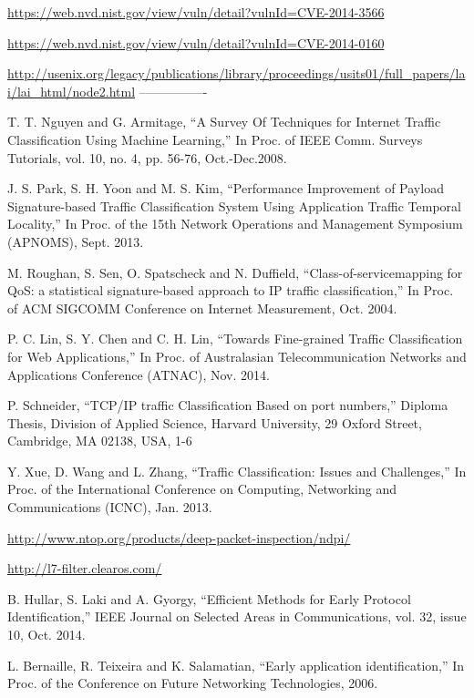 \begin{thebibliography}{1}
\url{https://web.nvd.nist.gov/view/vuln/detail?vulnId=CVE-2014-3566}

\url{https://web.nvd.nist.gov/view/vuln/detail?vulnId=CVE-2014-0160}

\url{http://usenix.org/legacy/publications/library/proceedings/usits01/full_papers/lai/lai_html/node2.html}
----------------

T. T. Nguyen and G. Armitage, 
``A Survey Of Techniques for Internet Traffic Classification Using Machine Learning,'' In Proc. of IEEE Comm. Surveys Tutorials, vol. 10, no. 4, pp. 56-76, Oct.-Dec.2008.

J. S. Park, S. H. Yoon and M. S. Kim,
``Performance Improvement of Payload Signature-based Traffic Classification System Using Application Traffic Temporal Locality,'' In Proc. of the 15th Network Operations and Management Symposium (APNOMS), Sept. 2013. 

M. Roughan, S. Sen, O. Spatscheck and N. Duffield, 
``Class-of-servicemapping for QoS: a statistical signature-based approach to IP traffic classification,''  In Proc. of ACM SIGCOMM Conference on Internet Measurement, Oct. 2004.

P. C. Lin, S. Y. Chen and C. H. Lin, 
``Towards Fine-grained Traffic Classification for Web Applications,'' In Proc. of Australasian Telecommunication Networks and Applications Conference (ATNAC), Nov. 2014.

P. Schneider,
``TCP/IP traffic Classification Based on port numbers,'' Diploma Thesis, Division of Applied Science, Harvard University, 29 Oxford Street, Cambridge, MA 02138, USA, 1-6

Y. Xue, D. Wang and L. Zhang,
``Traffic Classification: Issues and Challenges,'' In Proc. of the International Conference on Computing, Networking and Communications (ICNC), Jan. 2013.

\url{http://www.ntop.org/products/deep-packet-inspection/ndpi/}

\url{http://l7-filter.clearos.com/}

B. Hullar, S. Laki and A. Gyorgy,
``Efficient Methods for Early Protocol Identification,'' IEEE Journal on Selected Areas in Communications,  vol. 32, issue 10, Oct. 2014. 

L. Bernaille, R. Teixeira and K. Salamatian, 
``Early application identification,'' In Proc. of the Conference on Future Networking Technologies, 2006.


\end{thebibliography}
